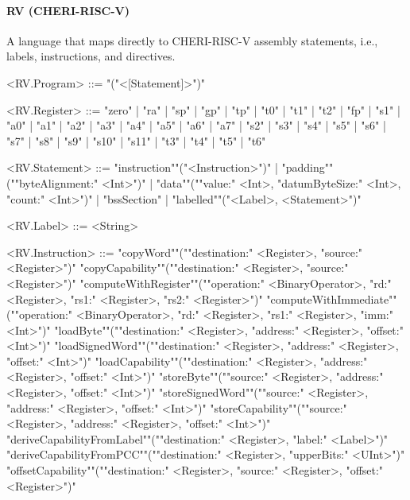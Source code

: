 \documentclass[main.tex]{subfiles}
\begin{document}
\paragraph{ RV (CHERI-RISC-V) } A language that maps directly to CHERI-RISC-V assembly statements, i.e., labels, instructions, and directives.
\begin{grammar}
	\footnotesize
				<RV.Program> ::=
							"("<[Statement]>")"
				\par
				<RV.Register> ::=
						"zero"
						| "ra"
						| "sp"
						| "gp"
						| "tp"
						| "t0"
						| "t1"
						| "t2"
						| "fp"
						| "s1"
						| "a0"
						| "a1"
						| "a2"
						| "a3"
						| "a4"
						| "a5"
						| "a6"
						| "a7"
						| "s2"
						| "s3"
						| "s4"
						| "s5"
						| "s6"
						| "s7"
						| "s8"
						| "s9"
						| "s10"
						| "s11"
						| "t3"
						| "t4"
						| "t5"
						| "t6"
				\par
				<RV.Statement> ::=
						"instruction""("<Instruction>")"
						| "padding""(""byteAlignment:" <Int>")"
						| "data""(""value:" <Int>, "datumByteSize:" <Int>, "count:" <Int>")"
						| "bssSection"
						| "labelled""("<Label>, <Statement>")"
				\par
				<RV.Label> ::=
						<String>
				\par
				<RV.Instruction> ::=
						"copyWord""(""destination:" <Register>, "source:" <Register>")"
						\alt "copyCapability""(""destination:" <Register>, "source:" <Register>")"
						\alt "computeWithRegister""(""operation:" <BinaryOperator>, "rd:" <Register>, "rs1:" <Register>, "rs2:" <Register>")"
						\alt "computeWithImmediate""(""operation:" <BinaryOperator>, "rd:" <Register>, "rs1:" <Register>, "imm:" <Int>")"
						\alt "loadByte""(""destination:" <Register>, "address:" <Register>, "offset:" <Int>")"
						\alt "loadSignedWord""(""destination:" <Register>, "address:" <Register>, "offset:" <Int>")"
						\alt "loadCapability""(""destination:" <Register>, "address:" <Register>, "offset:" <Int>")"
						\alt "storeByte""(""source:" <Register>, "address:" <Register>, "offset:" <Int>")"
						\alt "storeSignedWord""(""source:" <Register>, "address:" <Register>, "offset:" <Int>")"
						\alt "storeCapability""(""source:" <Register>, "address:" <Register>, "offset:" <Int>")"
						\alt "deriveCapabilityFromLabel""(""destination:" <Register>, "label:" <Label>")"
						\alt "deriveCapabilityFromPCC""(""destination:" <Register>, "upperBits:" <UInt>")"
						\alt "offsetCapability""(""destination:" <Register>, "source:" <Register>, "offset:" <Register>")"

\end{grammar}
\end{document}
